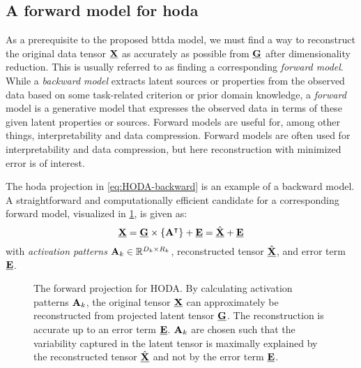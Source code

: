 \documentclass[twocolumn]{article}
\begin{document}
\subsection{A forward model for \acs{hoda}}

As a prerequisite to the proposed \ac{bttda} model, we must find a
way to reconstruct the original data tensor $\underline{\mathbf{X}}$ as accurately as possible
from $\underline{\mathbf{G}}$ after dimensionality reduction.
This is usually referred to as finding a corresponding \emph{forward model}.
While a \emph{backward model} extracts latent sources or properties from the observed
data based on some task-related criterion or prior domain knowledge,
a \emph{forward} model is a generative model that expresses the observed data in
terms of these given latent properties or sources.
Forward models are useful for, among other things, interpretability and data compression.
Forward models are often used for interpretability and data compression, but here
reconstruction with minimized error is of interest.

The \ac{hoda} projection in \cref{eq:HODA-backward} is an example
of a backward model.
A straightforward and computationally efficient candidate for a corresponding
forward model, visualized in \cref{fig:hoda-forward}, is given as:
\begin{equation}
	\underline{\mathbf{X}} = \underline{\mathbf{G}}\times\left\{\mathbf{A}^\intercal\right\} + \underline{\mathbf{E}} =
	\hat{\underline{\mathbf{X}}} + \underline{\mathbf{E}}
	\label{eq:HODA-forward}
\end{equation}
with \emph{activation patterns} $\mathbf{A}_k \in \mathbb{R}^{D_k\times R_k}$,
reconstructed tensor $\hat{\underline{\mathbf{X}}}$, and error term $\underline{\mathbf{E}}$.
\begin{figure*}[t]
	\centering
	
	\caption[A forward projection for \ac{hoda}.]{The forward projection for HODA.
		By calculating activation patterns $\mathbf{A}_k$, the original tensor $\underline{\mathbf{X}}$ can approximately be
		reconstructed from projected latent tensor $\underline{\mathbf{G}}$.
		The reconstruction is accurate up to an error term $\underline{\mathbf{E}}$.
		$\mathbf{A}_k$ are chosen such that the variability captured in the latent tensor is
		maximally explained by the reconstructed tensor $\hat{\underline{\mathbf{X}}}$ and not by
		the error term $\underline{\mathbf{E}}$.}
	\label{fig:hoda-forward}
\end{figure*}
\end{document}
